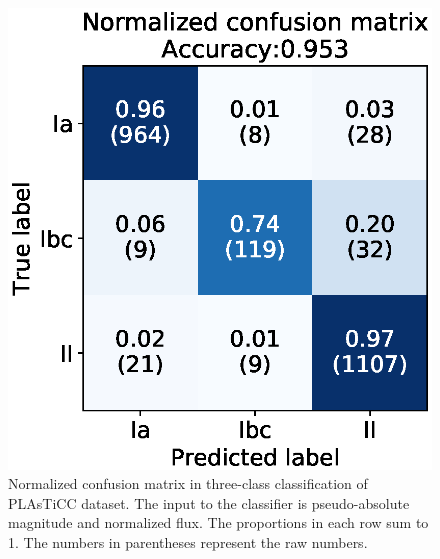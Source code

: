 \documentclass[proof]{pasj01}
\begin{document}
%
\begin{figure}[htbp]
  \begin{center}
     \includegraphics[width=\columnwidth]{figures/06_CM_abs-mag_scaled-flux_w-mixup_predictions_test_2.eps}
  \end{center}
  \caption{%
  Normalized confusion matrix in three-class classification of PLAsTiCC dataset. The input to the classifier is pseudo-absolute magnitude and normalized flux. The proportions in each row sum to 1. The numbers in parentheses represent the raw numbers.
  }%
  \label{fig:plasticc_3class_CM}
\end{figure}
%
\end{document}
